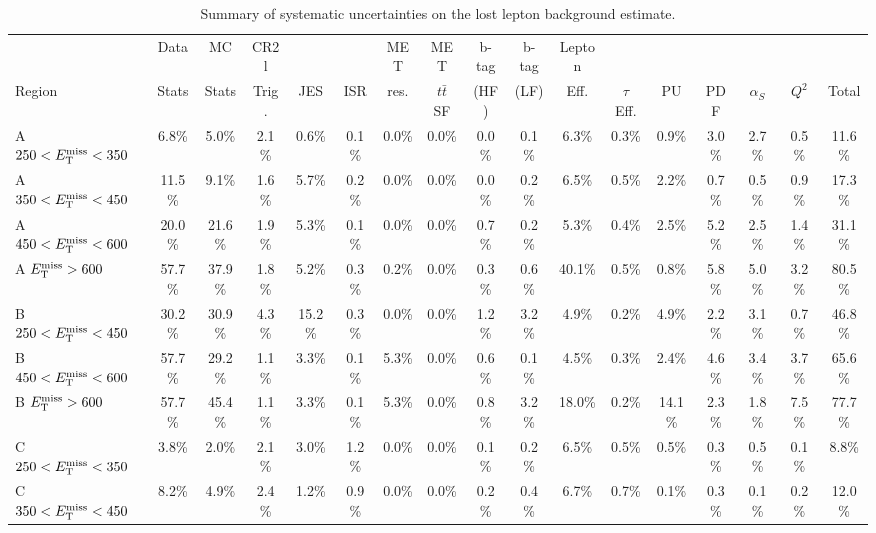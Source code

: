 \begin{table}
\centering
\scriptsize
\caption{Summary of systematic uncertainties on the lost lepton
  background estimate.}
\label{tab:stop:lostlep:systematics}
\begin{tabular}{| l | c c | c c c c c c c c c c c c c | c |}
\hline
& Data & MC &  CR2l  &  &  & MET  & MET  & b-tag & b-tag  & Lepton  &  &  &   &   &   &   \\
Region & Stats & Stats &  Trig.  & JES  & ISR  & res.  & $t\bar{t}$ SF  & (HF) & (LF)  & Eff.  & $\tau$ Eff.  & PU  & PDF  & $\alpha_{S}$  & $Q^{2}$  & Total  \\
\hline
 A  $250<E_\text{T}^\text{miss}<350$  & 6.8\%  & 5.0\%  & 2.1\%  & 0.6\%  & 0.1\%  & 0.0\%  & 0.0\%  & 0.0\%  & 0.1\%  & 6.3\%  & 0.3\%  & 0.9\%  & 3.0\%  & 2.7\%  & 0.5\%  & 11.6\%  \\
 A  $350<E_\text{T}^\text{miss}<450$  & 11.5\%  & 9.1\%  & 1.6\%  & 5.7\%  & 0.2\%  & 0.0\%  & 0.0\%  & 0.0\%  & 0.2\%  & 6.5\%  & 0.5\%  & 2.2\%  & 0.7\%  & 0.5\%  & 0.9\%  & 17.3\%  \\
 A  $450<E_\text{T}^\text{miss}<600$  & 20.0\%  & 21.6\%  & 1.9\%  & 5.3\%  & 0.1\%  & 0.0\%  & 0.0\%  & 0.7\%  & 0.2\%  & 5.3\%  & 0.4\%  & 2.5\%  & 5.2\%  & 2.5\%  & 1.4\%  & 31.1\%  \\
 A  $E_\text{T}^\text{miss} >600$  & 57.7\%  & 37.9\%  & 1.8\%  & 5.2\%  & 0.3\%  & 0.2\%  & 0.0\%  & 0.3\%  & 0.6\%  & 40.1\%  & 0.5\%  & 0.8\%  & 5.8\%  & 5.0\%  & 3.2\%  & 80.5\%  \\
\hline
 B  $250<E_\text{T}^\text{miss}<450$  & 30.2\%  & 30.9\%  & 4.3\%  & 15.2\%  & 0.3\%  & 0.0\%  & 0.0\%  & 1.2\%  & 3.2\%  & 4.9\%  & 0.2\%  & 4.9\%  & 2.2\%  & 3.1\%  & 0.7\%  & 46.8\%  \\
 B  $450<E_\text{T}^\text{miss}<600$  & 57.7\%  & 29.2\%  & 1.1\%  & 3.3\%  & 0.1\%  & 5.3\%  & 0.0\%  & 0.6\%  & 0.1\%  & 4.5\%  & 0.3\%  & 2.4\%  & 4.6\%  & 3.4\%  & 3.7\%  & 65.6\%  \\
 B  $E_\text{T}^\text{miss} >600$  & 57.7\%  & 45.4\%  & 1.1\%  & 3.3\%  & 0.1\%  & 5.3\%  & 0.0\%  & 0.8\%  & 3.2\%  & 18.0\%  & 0.2\%  & 14.1\%  & 2.3\%  & 1.8\%  & 7.5\%  & 77.7\%  \\
\hline
 C  $250<E_\text{T}^\text{miss}<350$  & 3.8\%  & 2.0\%  & 2.1\%  & 3.0\%  & 1.2\%  & 0.0\%  & 0.0\%  & 0.1\%  & 0.2\%  & 6.5\%  & 0.5\%  & 0.5\%  & 0.3\%  & 0.5\%  & 0.1\%  & 8.8\%  \\
 C  $350<E_\text{T}^\text{miss}<450$  & 8.2\%  & 4.9\%  & 2.4\%  & 1.2\%  & 0.9\%  & 0.0\%  & 0.0\%  & 0.2\%  & 0.4\%  & 6.7\%  & 0.7\%  & 0.1\%  & 0.3\%  & 0.1\%  & 0.2\%  & 12.0\%  \\

\end{tabular}
\end{table}
